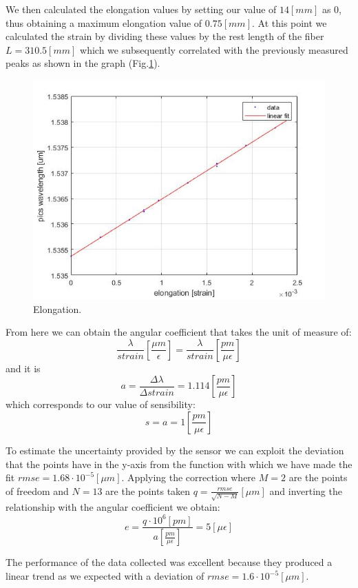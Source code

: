 We then calculated the elongation values by setting our value of $14 [mm]$ as 0, thus obtaining a maximum elongation value of $0.75 [mm]$. At this point we calculated the strain by dividing these values by the rest length of the fiber $L = 310.5 [mm]$ which we subsequently correlated with the previously measured peaks as shown in the graph (Fig.\ref{fig:spins}).
\begin{figure}[h]
    \centering
    \includegraphics[scale=0.7]{img/spins.jpg}
    \caption{Elongation.}
    \label{fig:spins}
\end{figure}
From here we can obtain the angular coefficient that takes the unit of measure of:
$$\frac{\lambda}{strain}\left[\frac{\mu m}{\epsilon}\right] = \frac{\lambda}{strain}\left[\frac{pm}{\mu\epsilon}\right]$$
and it is
$$a = \frac{\Delta \lambda}{ \Delta strain} = 1.114 \left[\frac{pm}{\mu\epsilon}\right]$$
which corresponds to our value of sensibility:
$$s = a = 1 \left[\frac{pm}{\mu\epsilon}\right]$$

To estimate the uncertainty provided by the sensor we can exploit the deviation that the points have in the y-axis from the function with which we have made the fit $rmse = 1.68\cdot10^{-5} [\mu m]$. Applying the correction where $M = 2$ are the points of freedom and $N = 13$ are the points taken $q = \frac{rmse}{\sqrt{N - M}} [\mu m]$ and inverting the relationship with the angular coefficient we obtain:
$$e = \frac{q \cdot 10^{6} [pm]}{a \left[\frac{pm}{\mu\epsilon}\right]} = 5 [\mu\epsilon]$$

\newpage
{}
The performance of the data collected was excellent because they produced a linear trend as we expected with a deviation of $rmse = 1.6 \cdot 10^{-5}[\mu m]$.

